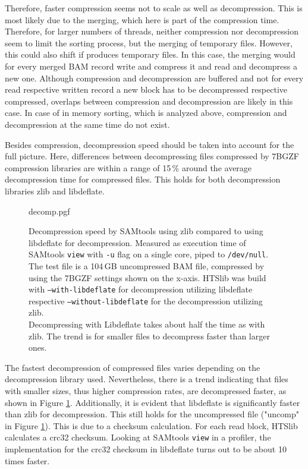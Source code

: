 Therefore, faster compression seems not to scale as well as decompression. This is most likely due to the merging, which here is part of the compression time. Therefore, for larger numbers of threads, neither compression nor decompression seem to limit the sorting process, but the merging of temporary files. However, this could also shift if \sort produces temporary files. In this case, the merging would for every merged BAM record write and compress it and read and decompress a new one. Although compression and decompression are buffered and not for every read respective written record a new block has to be decompressed respective compressed, overlaps between compression and decompression are likely in this case. In case of in memory sorting, which is analyzed above, compression and decompression at the same time do not exist. 


Besides compression, decompression speed should be taken into account for the full picture. Here, differences between decompressing files compressed by 7BGZF compression libraries are within a range of 15\,\% around the average decompression time for compressed files. This holds for both decompression libraries zlib and libdeflate.
\begin{figure}
        {decomp.pgf}
    \caption{Decompression speed by SAMtools using zlib compared to using libdeflate for decompression. Measured as execution time of SAMtools \texttt{view} with \texttt{-u} flag on a single core, piped to \texttt{/dev/null}. The test file is a 104\,GB uncompressed BAM file, compressed by \sort using the 7BGZF settings shown on the x-axis. HTSlib was build with \texttt{--with-libdeflate} for decompression utilizing libdeflate respective \texttt{--without-libdeflate} for the decompression utilizing zlib.\\
    Decompressing with Libdeflate takes about half the time as with zlib. The trend is for smaller files to decompress faster than larger ones.}
    \label{fig:decomp}
\end{figure}
The fastest decompression of compressed files varies depending on the decompression library used. Nevertheless, there is a trend indicating that files with smaller sizes, thus higher compression rates, are decompressed faster, as shown in Figure \ref{fig:decomp}. 
Additionally, it is evident that libdeflate is significantly faster than zlib for decompression. This still holds for the uncompressed file ("uncomp" in Figure \ref{fig:decomp}). This is due to a checksum calculation. For each read block, HTSlib calculates a crc32 checksum. Looking at SAMtools \texttt{view} in a profiler, the implementation for the crc32 checksum in libdeflate turns out to be about 10 times faster. \\

